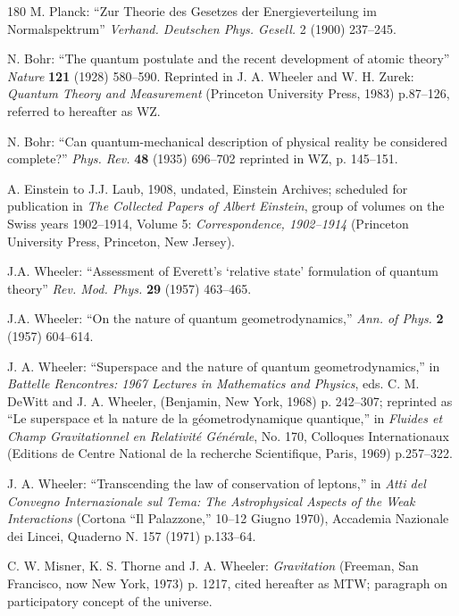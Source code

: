 \documentclass[11pt]{article}
\begin{document}
\begin{thebibliography}{180}
		M. Planck: ``Zur Theorie des Gesetzes der Energieverteilung im Normalspektrum'' \emph{Verhand. Deutschen Phys. Gesell.} 2 (1900) 237--245.
		
		N. Bohr: ``The quantum postulate and the recent development of atomic theory'' \emph{Nature} \textbf{121} (1928) 580--590. Reprinted in J. A. Wheeler and W. H. Zurek: \emph{Quantum Theory and Measurement} (Princeton University Press, 1983) p.87--126, referred to hereafter as WZ.
		
		N. Bohr: ``Can quantum-mechanical description of physical reality be considered complete?'' \emph{Phys. Rev.} \textbf{48} (1935) 696--702 reprinted in WZ, p. 145--151.
		
		A. Einstein to J.J. Laub, 1908, undated, Einstein Archives; scheduled for publication in \emph{The Collected Papers of Albert Einstein}, group of volumes on the Swiss years 1902--1914, Volume 5: \emph{Correspondence, 1902--1914} (Princeton University Press, Princeton, New Jersey).
		
		J.A. Wheeler: ``Assessment of Everett's `relative state' formulation of quantum theory'' \emph{Rev. Mod. Phys.} \textbf{29} (1957) 463--465.
		
		J.A. Wheeler: ``On the nature of quantum geometrodynamics,'' \emph{Ann. of Phys.} \textbf{2} (1957) 604--614.
		
		J. A. Wheeler: ``Superspace and the nature of quantum geometrodynamics,'' in \emph{Battelle Rencontres: 1967 Lectures in Mathematics and Physics}, eds. C. M. DeWitt and J. A. Wheeler, (Benjamin, New York, 1968) p. 242--307; reprinted as ``Le superspace et la nature de la g\'eometrodynamique quantique,'' in \emph{Fluides et Champ Gravitationnel en Relativit\'e G\'en\'erale}, No. 170, Colloques Internationaux (Editions de Centre National de la recherche Scientifique, Paris, 1969) p.257--322.
		
		J. A. Wheeler: ``Transcending the law of conservation of leptons,'' in \emph{Atti del Convegno Internazionale sul Tema: The Astrophysical Aspects of the Weak Interactions} (Cortona ``Il Palazzone,'' 10--12 Giugno 1970), Accademia Nazionale dei Lincei, Quaderno N. 157 (1971) p.133--64.
		
		C. W. Misner, K. S. Thorne and J. A. Wheeler: \emph{Gravitation} (Freeman, San Francisco, now New York, 1973) p. 1217, cited hereafter as MTW; paragraph on participatory concept of the universe.
		

\end{thebibliography}
\end{document}
